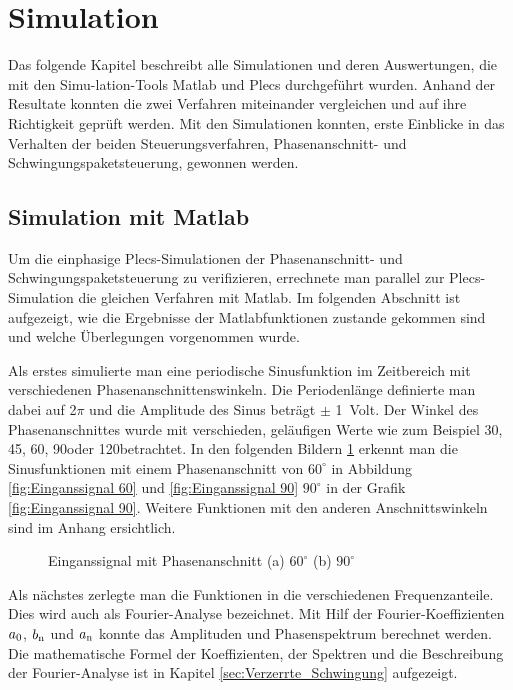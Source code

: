 \section{Simulation}

Das folgende Kapitel beschreibt alle Simulationen und deren Auswertungen, die mit den Simu-lation-Tools Matlab und Plecs durchgeführt wurden. Anhand der Resultate konnten die zwei Verfahren miteinander vergleichen und auf ihre Richtigkeit geprüft werden. Mit den Simulationen konnten, erste Einblicke in das Verhalten der beiden Steuerungsverfahren, Phasenanschnitt- und Schwingungspaketsteuerung, gewonnen werden.

\subsection{Simulation mit Matlab}
Um die einphasige Plecs-Simulationen der Phasenanschnitt- und Schwingungspaketsteuerung zu verifizieren, errechnete man parallel zur Plecs-Simulation die gleichen Verfahren mit Matlab. Im folgenden Abschnitt ist aufgezeigt, wie die Ergebnisse der Matlabfunktionen zustande gekommen sind und welche Überlegungen vorgenommen wurde.  




Als erstes simulierte man eine periodische Sinusfunktion im Zeitbereich mit verschiedenen Phasenanschnittenswinkeln. Die Periodenlänge definierte man dabei auf 2$\pi$ und die Amplitude des Sinus beträgt $\pm$ \SI{1}{Volt}. Der Winkel des Phasenanschnittes wurde mit verschieden, geläufigen Werte wie zum Beispiel 30\textdegree, 45\textdegree, 60\textdegree, 90\textdegree oder 120\textdegree betrachtet. In den folgenden Bildern \ref{fig:eingangssignal_mit_Matlab} erkennt man die Sinusfunktionen mit einem Phasenanschnitt von $60^\circ$ in Abbildung \ref{fig:Einganssignal 60} und \ref{fig:Einganssignal 90} $90^\circ$ in der Grafik \ref{fig:Einganssignal 90}. Weitere Funktionen mit den anderen Anschnittswinkeln sind im Anhang ersichtlich.
 

\begin{figure}[h]
	\centering
	\qquad
	\caption{Einganssignal mit Phasenanschnitt (a) $60^\circ$ (b) $90^\circ$}
	\label{fig:eingangssignal_mit_Matlab}
\end{figure} 

Als nächstes zerlegte man die Funktionen in die verschiedenen Frequenzanteile. Dies wird auch als Fourier-Analyse bezeichnet. Mit Hilf der Fourier-Koeffizienten $a\textsubscript{0}$, $b\textsubscript{n}$ und $a\textsubscript{n}$ konnte das Amplituden und Phasenspektrum berechnet werden. Die mathematische Formel der Koeffizienten, der Spektren und die Beschreibung der Fourier-Analyse ist in Kapitel \ref{sec:Verzerrte_Schwingung} aufgezeigt.
  

